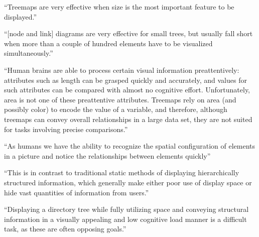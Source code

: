 \enquote{Treemaps are very effective when size is the most important feature to be displayed.}\cite[2]{bruls2000squarified}


\enquote{[node and link] diagrams are very effective for small trees, but usually fall short when more than a couple of hundred elements have to be visualized simultaneously.}\cite[2]{bruls2000squarified}

\enquote{Human brains are able to process certain visual information preattentively: attributes such as length can be grasped quickly and accurately, and values for such attributes can be compared with almost no cognitive effort. Unfortunately, area is not one of these preattentive attributes. Treemaps rely on area (and possibly color) to encode the value of a variable, and therefore, although treemaps can convey overall relationships in a large data set, they are not suited for tasks involving precise comparisons.}\cite{laubheimer_2019}

\enquote{As humans we have the ability to recognize the spatial configuration of
elements in a picture and notice the relationships between elements quickly}\cite[2]{johnson1998tree}

\enquote{This is in contrast to traditional static methods of displaying
hierarchically structured information, which generally make either poor use of
display space or hide vast quantities of information from users.}\cite[2]{johnson1998tree}

\enquote{Displaying a directory tree while fully utilizing space and conveying structural information in a visually appealing and low cognitive load manner is a difficult task, as these are often opposing goals.}\cite[8]{johnson1998tree}